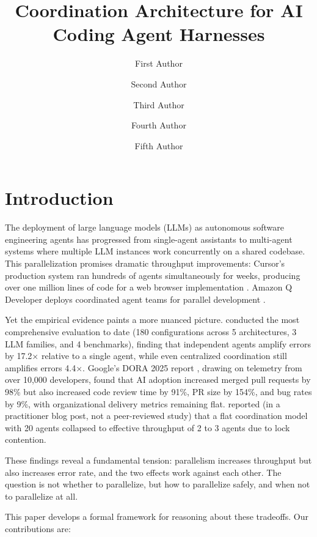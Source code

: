 \documentclass[11pt, a4paper, copyright]{googledeepmind}
\title{Coordination Architecture for AI Coding Agent Harnesses}
\author[1]{First Author}
\author[2]{Second Author}
\author[2]{Third Author}
\author[1]{Fourth Author}
\author[1]{Fifth Author}
\affil[*]{Equal Contribution}
\affil[1]{Affiliation 1}
\affil[2]{Affiliation 2}
\begin{document}
\maketitle

\section{Introduction}
\label{sec:intro}

The deployment of large language models (LLMs) as autonomous software engineering agents has progressed from single-agent assistants to multi-agent systems where multiple LLM instances work concurrently on a shared codebase.
This parallelization promises dramatic throughput improvements: Cursor's production system ran hundreds of agents simultaneously for weeks, producing over one million lines of code for a web browser implementation \citep{Cursor2026}.
Amazon Q Developer deploys coordinated agent teams for parallel development \citep{Osmani2025}.

Yet the empirical evidence paints a more nuanced picture.
\citet{Kim2025} conducted the most comprehensive evaluation to date (180 configurations across 5 architectures, 3 LLM families, and 4 benchmarks), finding that independent agents amplify errors by 17.2$\times$ relative to a single agent, while even centralized coordination still amplifies errors 4.4$\times$.
Google's DORA 2025 report \citep{DORA2025}, drawing on telemetry from over 10,000 developers, found that AI adoption increased merged pull requests by 98\% but also increased code review time by 91\%, PR size by 154\%, and bug rates by 9\%, with organizational delivery metrics remaining flat.
\citet{Cursor2026} reported (in a practitioner blog post, not a peer-reviewed study) that a flat coordination model with 20 agents collapsed to effective throughput of 2 to 3 agents due to lock contention.

These findings reveal a fundamental tension: parallelism increases throughput but also increases error rate, and the two effects work against each other.
The question is not whether to parallelize, but how to parallelize safely, and when not to parallelize at all.

This paper develops a formal framework for reasoning about these tradeoffs.
Our contributions are:
\end{document}
